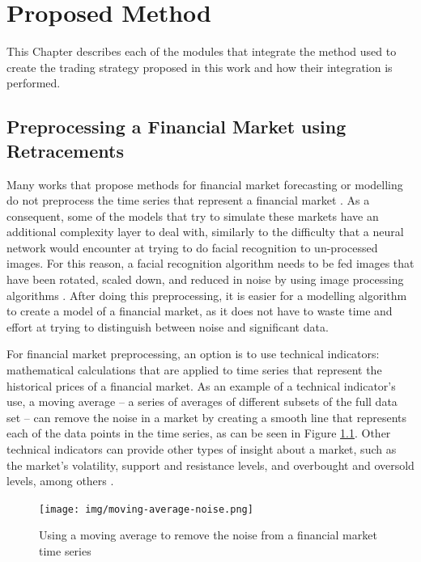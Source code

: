 \chapter{Proposed Method}
\label{chapter:proposed-method}

This Chapter describes each of the modules that integrate the method used to
create the trading strategy proposed in this work and how their integration is
performed.

\section{Preprocessing a Financial Market using Retracements}
\label{section:preprocessing-a-financial-market-using-retracements}

Many works that propose methods for financial market forecasting or modelling do
not preprocess the time series that represent a financial market \cite{}. As a
consequent, some of the models that try to simulate these markets have an
additional complexity layer to deal with, similarly to the difficulty that a
neural network would encounter at trying to do facial recognition to
un-processed images. For this reason, a facial recognition algorithm needs to be
fed images that have been rotated, scaled down, and reduced in noise by using
image processing algorithms \cite{}. After doing this preprocessing, it is
easier for a modelling algorithm to create a model of a financial market, as it
does not have to waste time and effort at trying to distinguish between noise
and significant data.

For financial market preprocessing, an option is to use technical indicators:
mathematical calculations that are applied to time series that represent the
historical prices of a financial market. As an example of a technical
indicator's use, a moving average -- a series of averages of different subsets
of the full data set -- can remove the noise in a market by creating a smooth
line that represents each of the data points in the time series, as can be seen
in Figure \ref{figure:moving-average-noise}. Other technical indicators can
provide other types of insight about a market, such as the market's volatility,
support and resistance levels, and overbought and oversold levels, among others
\cite{}.

\begin{figure}
\caption{Using a moving average to remove the noise from a financial market time
series} \centering
\texttt{[image: img/moving-average-noise.png]}
\label{figure:moving-average-noise}
\end{figure}

